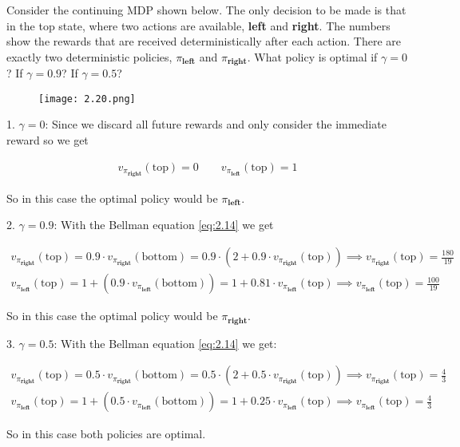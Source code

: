 \begin{exercise}
Consider the continuing MDP shown below.
The only decision to be made is that in the top state, where two actions are available, \textbf{left} and \textbf{right}.
The numbers show the rewards that are received deterministically after each action.
There are exactly two deterministic policies, $\pi_\textbf{left}$ and $\pi_\textbf{right}$.
What policy is optimal if $\gamma = 0$?
If $\gamma = 0.9$?
If $\gamma = 0.5$?

\begin{figure}[H]
    \centering
    \texttt{[image: 2.20.png]}
    \caption{}
    \label{fig:2.20}
\end{figure}

\end{exercise}

\begin{solution}
1. $\gamma = 0$: Since we discard all future rewards and only consider the immediate reward so we get

\begin{align*}
  v_{\pi_\textbf{right}}(\text{top}) = 0 \qquad
  v_{\pi_\textbf{left}}(\text{top}) = 1
\end{align*}

So in this case the optimal policy would be $\pi_\textbf{left}$.

2. $\gamma = 0.9$: With the Bellman equation \eqref{eq:2.14} we get

\begin{align*}
  v_{\pi_\textbf{right}}(\text{top})
  =
  0.9 \cdot v_{\pi_\textbf{right}}(\text{bottom})
  =
  0.9 \cdot (2 + 0.9 \cdot v_{\pi_\textbf{right}}(\text{top}))
  \implies
  v_{\pi_\textbf{right}}(\text{top}) = \frac{180}{19} \\
  v_{\pi_\textbf{left}}(\text{top})
  =
  1 + (0.9 \cdot v_{\pi_\textbf{left}}(\text{bottom}))
  =
  1 + 0.81 \cdot v_{\pi_\textbf{left}}(\text{top})
  \implies
  v_{\pi_\textbf{left}}(\text{top}) = \frac{100}{19}
\end{align*}

So in this case the optimal policy would be $\pi_\textbf{right}$.

3. $\gamma = 0.5$: With the Bellman equation \eqref{eq:2.14} we get:

\begin{align*}
v_{\pi_\textbf{right}}(\text{top})
=
0.5 \cdot v_{\pi_\textbf{right}}(\text{bottom})
=
0.5 \cdot (2 + 0.5 \cdot v_{\pi_\textbf{right}}(\text{top}))
\implies
v_{\pi_\textbf{right}}(\text{top}) = \frac{4}{3} \\
v_{\pi_\textbf{left}}(\text{top})
=
1 + (0.5 \cdot v_{\pi_\textbf{left}}(\text{bottom}))
=
1 + 0.25 \cdot v_{\pi_\textbf{left}}(\text{top})
\implies
v_{\pi_\textbf{left}}(\text{top}) = \frac{4}{3}
\end{align*}

So in this case both policies are optimal.
\end{solution}
